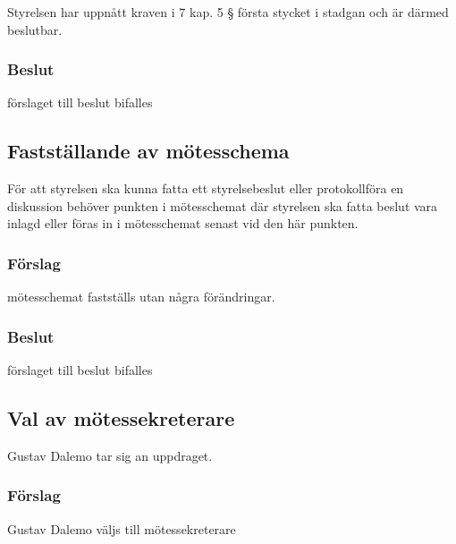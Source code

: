 \documentclass[protokoll]{dvd}
\begin{document}
\begin{attsatser}
    \item Styrelsen har uppnått kraven i 7 kap. 5 § första stycket i stadgan och är därmed beslutbar.
\end{attsatser}
\subsubsection*{Beslut}
\begin{attsatser}
    \item förslaget till beslut bifalles
\end{attsatser}


\subsection{Fastställande av mötesschema}

För att styrelsen ska kunna fatta ett styrelsebeslut eller protokollföra en diskussion behöver punkten i mötesschemat där styrelsen ska fatta beslut vara inlagd eller föras in i mötesschemat senast vid den här punkten.

\subsubsection*{Förslag}

\begin{attsatser}
    \item mötesschemat fastställs utan några förändringar.
\end{attsatser}
\subsubsection*{Beslut}
\begin{attsatser}
    \item förslaget till beslut bifalles
\end{attsatser}

\subsection{Val av mötessekreterare}
Gustav Dalemo tar sig an uppdraget.
\subsubsection*{Förslag}
\begin{attsatser}
    \item Gustav Dalemo väljs till mötessekreterare
\end{attsatser}
\end{document}
